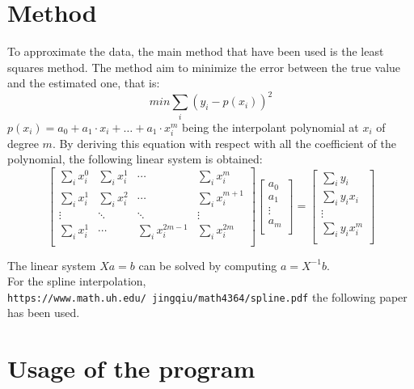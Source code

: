 \documentclass[12pt]{article}
\begin{document}
 \section{Method}
 To approximate the data, the main method that have been used is the least squares method. The method aim to minimize the error between the true value and the estimated one, that is:
 \begin{equation}
 min \sum_i (y_i - p(x_i))^2
 \end{equation}
 $p(x_i) = a_0 + a_1\cdot x_i+ \ldots +a_1\cdot x_i^m$ being the interpolant polynomial at $x_i$ of degree $m$.
 By deriving this equation with respect with all the coefficient of the polynomial, the following linear system is obtained:
 \begin{equation}
\left[ \begin{array}{cccc}
\sum_i x_i^0 & \sum_i x_i^1 & \cdots & \sum_i x_i^m \\
\sum_i x_i^1 & \sum_i x_i^2 & \cdots & \sum_i x_i^{m+1} \\
\vdots & \ddots & \ddots & \vdots \\
\sum_i x_i^1& \cdots & \sum_i x_i^{2m-1} & \sum_i x_i^{2m}\\
\end{array} \right]
\left[ \begin{array}{c}
a_0 \\
a_1\\
\vdots\\
a_m\\
\end{array} \right] = 
\left[ \begin{array}{c}
\sum_i y_i  \\
\sum_i y_i x_i\\
\vdots\\
\sum_i y_i x_i^m\\
\end{array} \right]
\end{equation}
 
The linear system $Xa=b$ can be solved by computing $a = X^{-1}b$.\\
For the spline interpolation, \texttt{https://www.math.uh.edu/~jingqiu/math4364/spline.pdf} the following paper has been used.
 
\section{Usage of the program}
\end{document}

